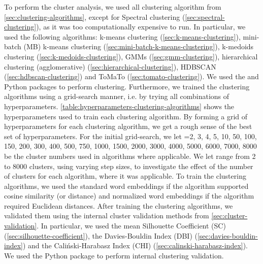 To perform the cluster analysis, we used all clustering algorithm from \cref{sec:clustering-algorithms}, except for Spectral clustering (\cref{sec:spectral-clustering}), as it was too computationally expensive to run. In particular, we used the following algorithms: k-means clustering (\cref{sec:k-means-clustering}), mini-batch (MB) k-means clustering (\cref{sec:mini-batch-k-means-clustering}), k-medoids clustering (\cref{sec:k-medoids-clustering}), GMMs (\cref{sec:gmm-clustering}), hierarchical clustering (agglomerative) (\cref{sec:hierarchical-clustering}), HDBSCAN (\cref{sec:hdbscan-clustering}) and ToMaTo (\cref{sec:tomato-clustering}). We used the  \cite{ScikitLearn2011} and  \cite{mcinnes2017hdbscan} Python packages to perform clustering. Furthermore, we trained the clustering algorithms using a grid-search manner, i.e. by trying all combinations of hyperparameters. \cref{table:hyperparameters-clustering-algorithms} shows the hyperparameters used to train each clustering algorithm. By forming a grid of hyperparameters for each clustering algorithm, we get a rough sense of the best set of hyperparameters. For the initial grid-search, we let =2, 3, 4, 5, 10, 50, 100, 150, 200, 300, 400, 500, 750, 1000, 1500, 2000, 3000, 4000, 5000, 6000, 7000, 8000 be the cluster numbers used in algorithms where applicable. We let  range from 2 to 8000 clusters, using varying step sizes, to investigate the effect of the number of clusters for each algorithm, where it was applicable. To train the clustering algorithms, we used the standard word embeddings if the algorithm supported cosine similarity (or distance) and normalized word embeddings if the algorithm required Euclidean distances. After training the clustering algorithms, we validated them using the internal cluster validation methods from \cref{sec:cluster-validation}. In particular, we used the mean Silhouette Coefficient (SC) (\cref{sec:silhouette-coefficient}), the Davies-Bouldin Index (DBI) (\cref{sec:davies-bouldin-index}) and the Caliński-Harabasz Index (CHI) (\cref{sec:calinski-harabasz-index}). We used the  Python package to perform internal clustering validation.
